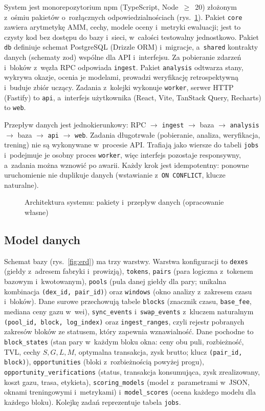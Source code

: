System jest monorepozytorium npm (TypeScript, Node~$\geq$~20) złożonym z~ośmiu pakietów
o~rozłącznych odpowiedzialnościach (rys.~\ref{fig:arch}). Pakiet \texttt{core} zawiera arytmetykę
AMM, cechy, modele oceny i~metryki ewaluacji; jest to czysty kod bez dostępu do bazy i~sieci,
w~całości testowalny jednostkowo. Pakiet \texttt{db} definiuje schemat PostgreSQL (Drizzle ORM)
i~migracje, a~\texttt{shared} kontrakty danych (schematy zod) wspólne dla API i~interfejsu.
Za pobieranie zdarzeń i~bloków z~węzła RPC odpowiada \texttt{ingest}. Pakiet \texttt{analysis}
odtwarza stany, wykrywa okazje, ocenia je modelami, prowadzi weryfikację retrospektywną
i~buduje zbiór uczący. Zadania z~kolejki wykonuje \texttt{worker}, serwer HTTP (Fastify) to
\texttt{api}, a~interfejs użytkownika (React, Vite, TanStack Query, Recharts) to \texttt{web}.

Przepływ danych jest jednokierunkowy: RPC $\rightarrow$ \texttt{ingest} $\rightarrow$ baza
$\rightarrow$ \texttt{analysis} $\rightarrow$ baza $\rightarrow$ \texttt{api} $\rightarrow$
\texttt{web}. Zadania długotrwałe (pobieranie, analiza, weryfikacja, trening) nie są wykonywane
w~procesie API. Trafiają jako wiersze do tabeli \texttt{jobs} i~podejmuje je osobny proces
\texttt{worker}, więc interfejs pozostaje responsywny, a~zadania można wznowić po awarii. Każdy
krok jest idempotentny: ponowne uruchomienie nie duplikuje danych (wstawianie
z~\texttt{ON CONFLICT}, klucze naturalne).
\begin{figure}[H]\centering\resizebox{\linewidth}{!}{}
\caption{Architektura systemu: pakiety i~przepływ danych (opracowanie własne)}\label{fig:arch}\end{figure}

\subsection{Model danych}

Schemat bazy (rys.~\ref{fig:erd}) ma trzy warstwy. Warstwa konfiguracji to \texttt{dexes}
(giełdy z~adresem fabryki i~prowizją), \texttt{tokens}, \texttt{pairs} (para logiczna z~tokenem
bazowym i~kwotowanym), \texttt{pools} (pula danej giełdy dla pary; unikalna kombinacja
\texttt{(dex\_id, pair\_id)}) oraz \texttt{windows} (okno analizy z~zakresem czasu i~bloków).
Dane surowe przechowują tabele \texttt{blocks} (znacznik czasu, \texttt{base\_fee}, mediana ceny
gazu w~wei), \texttt{sync\_events} i~\texttt{swap\_events} z~kluczem naturalnym
\texttt{(pool\_id, block, log\_index)} oraz \texttt{ingest\_ranges}, czyli rejestr pobranych
zakresów bloków ze statusem, który zapewnia wznawialność. Dane pochodne to \texttt{block\_states}
(stan pary w~każdym bloku okna: ceny obu puli, rozbieżność, TVL, cechy $S,G,L,M$, optymalna
transakcja, zysk brutto; klucz \texttt{(pair\_id, block)}), \texttt{opportunities} (bloki
z~rozbieżnością powyżej progu), \texttt{opportunity\_verifications} (status, transakcja
konsumująca, zysk zrealizowany, koszt gazu, trasa, etykieta), \texttt{scoring\_models} (model
z~parametrami w~JSON, oknami treningowymi i~metrykami) i~\texttt{model\_scores} (ocena każdego
modelu dla każdego bloku). Kolejkę zadań reprezentuje tabela \texttt{jobs}.

